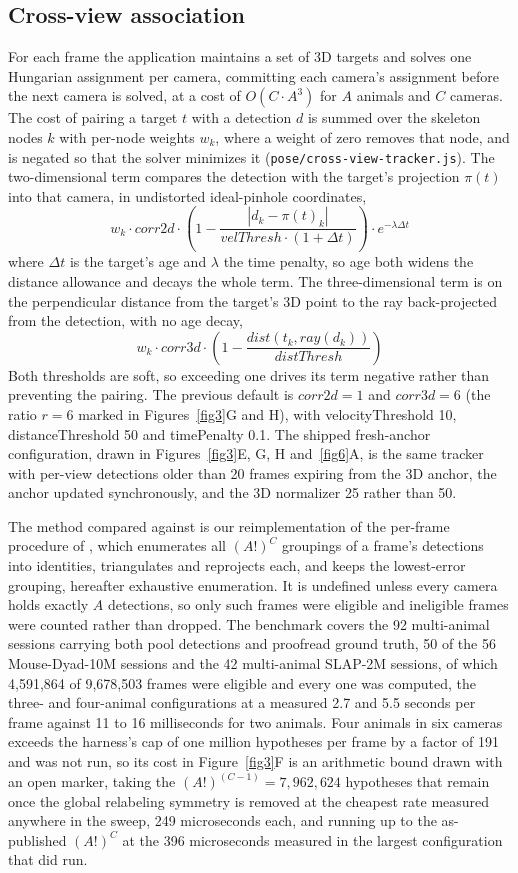 \documentclass[pdflatex, sn-nature]{sn-jnl}
\theoremstyle{thmstyleone}%
\theoremstyle{thmstyletwo}%
\theoremstyle{thmstylethree}%
\begin{document}
\subsection{Cross-view association}\label{methods-association}

For each frame the application maintains a set of 3D targets and solves one Hungarian assignment per camera, committing each camera's assignment before the next camera is solved, at a cost of $O(C \cdot A^3)$ for $A$ animals and $C$ cameras. The cost of pairing a target $t$ with a detection $d$ is summed over the skeleton nodes $k$ with per-node weights $w_k$, where a weight of zero removes that node, and is negated so that the solver minimizes it (\texttt{pose/cross-view-tracker.js}). The two-dimensional term compares the detection with the target's projection $\pi(t)$ into that camera, in undistorted ideal-pinhole coordinates,
\[
  w_k \cdot corr2d \cdot \left(1 - \frac{|d_k - \pi(t)_k|}{velThresh \cdot (1 + \Delta t)}\right) \cdot e^{-\lambda \Delta t}
\]
where $\Delta t$ is the target's age and $\lambda$ the time penalty, so age both widens the distance allowance and decays the whole term. The three-dimensional term is on the perpendicular distance from the target's 3D point to the ray back-projected from the detection, with no age decay,
\[
  w_k \cdot corr3d \cdot \left(1 - \frac{dist(t_k, ray(d_k))}{distThresh}\right)
\]
Both thresholds are soft, so exceeding one drives its term negative rather than preventing the pairing. The previous default is $corr2d = 1$ and $corr3d = 6$ (the ratio $r = 6$ marked in Figures~\ref{fig3}G and H), with velocityThreshold 10, distanceThreshold 50 and timePenalty 0.1. The shipped fresh-anchor configuration, drawn in Figures~\ref{fig3}E, G, H and~\ref{fig6}A, is the same tracker with per-view detections older than 20 frames expiring from the 3D anchor, the anchor updated synchronously, and the 3D normalizer 25 rather than 50.

The method compared against is our reimplementation of the per-frame procedure of \citep{Maree2024}, which enumerates all $(A!)^C$ groupings of a frame's detections into identities, triangulates and reprojects each, and keeps the lowest-error grouping, hereafter exhaustive enumeration. It is undefined unless every camera holds exactly $A$ detections, so only such frames were eligible and ineligible frames were counted rather than dropped. The benchmark covers the 92 multi-animal sessions carrying both pool detections and proofread ground truth, 50 of the 56 Mouse-Dyad-10M sessions and the 42 multi-animal SLAP-2M sessions, of which 4,591,864 of 9,678,503 frames were eligible and every one was computed, the three- and four-animal configurations at a measured 2.7 and 5.5 seconds per frame against 11 to 16 milliseconds for two animals. Four animals in six cameras exceeds the harness's cap of one million hypotheses per frame by a factor of 191 and was not run, so its cost in Figure~\ref{fig3}F is an arithmetic bound drawn with an open marker, taking the $(A!)^{(C-1)} = 7{,}962{,}624$ hypotheses that remain once the global relabeling symmetry is removed at the cheapest rate measured anywhere in the sweep, 249 microseconds each, and running up to the as-published $(A!)^C$ at the 396 microseconds measured in the largest configuration that did run.
\end{document}
